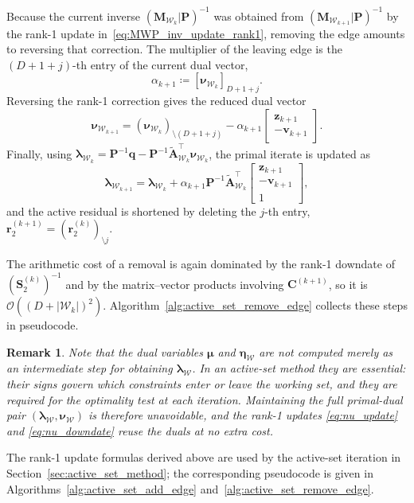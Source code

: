 \documentclass[a4paper,12pt,openany]{book}
\newcommand{\A}{\mathbf{A}}
\newcommand{\C}{\mathbf{C}}
\newcommand{\M}{\mathbf{M}}
\renewcommand{\P}{\mathbf{P}}
\newcommand{\q}{\mathbf{q}}
\renewcommand{\r}{\mathbf{r}}
\renewcommand{\v}{\mathbf{v}}
\newcommand{\z}{\mathbf{z}}
\newcommand{\lh}{\boldsymbol{\lambda}}
\newtheorem{remark}[theorem]{Remark}
\begin{document}
\begin{appendices}
Because the current inverse $(\M_{\mathcal{W}_k}|\P)^{-1}$ was obtained from $(\M_{\mathcal{W}_{k+1}}|\P)^{-1}$ by the rank-1 update in~\eqref{eq:MWP_inv_update_rank1}, removing the edge amounts to reversing that correction. The multiplier of the leaving edge is the $(D+1+j)$-th entry of the current dual vector,
\begin{equation}
	\alpha_{k+1}\coloneqq[\boldsymbol{\nu}_{\mathcal{W}_k}]_{D+1+j}.
\end{equation}
Reversing the rank-1 correction gives the reduced dual vector
\begin{equation}
	\label{eq:nu_downdate}
	\boldsymbol{\nu}_{\mathcal{W}_{k+1}}
	=
	(\boldsymbol{\nu}_{\mathcal{W}_k})_{\setminus(D+1+j)}
	-
	\alpha_{k+1}
	\begin{bmatrix}
		\z_{k+1} \\ -\v_{k+1}
	\end{bmatrix}.
\end{equation}
Finally, using $\lh_{\mathcal{W}_k}=\P^{-1}\q-\P^{-1}\tilde{\A}_{\mathcal{W}_k}^\top\boldsymbol{\nu}_{\mathcal{W}_k}$, the primal iterate is updated as
\begin{equation}
	\label{eq:lambda_downdate}
	\lh_{\mathcal{W}_{k+1}}
	=
	\lh_{\mathcal{W}_k}
	+
	\alpha_{k+1}
	\P^{-1}
	\tilde{\A}_{\mathcal{W}_k}^\top
	\begin{bmatrix}
		\z_{k+1} \\ -\v_{k+1} \\ 1
	\end{bmatrix},
\end{equation}
and the active residual is shortened by deleting the $j$-th entry, $\r_2^{(k+1)}=(\r_2^{(k)})_{\setminus j}$.

The arithmetic cost of a removal is again dominated by the rank-1 downdate of $(\mathbf{S}_2^{(k)})^{-1}$ and by the matrix--vector products involving $\C^{(k+1)}$, so it is $\mathcal{O}((D+|\mathcal{W}_k|)^2)$. Algorithm~\ref{alg:active_set_remove_edge} collects these steps in pseudocode.

\begin{remark}
	Note that the dual variables $\boldsymbol{\mu}$ and $\boldsymbol{\eta}_\mathcal{W}$ are not computed merely as an intermediate step for obtaining $\lh_\mathcal{W}$. In an active-set method they are essential: their signs govern which constraints enter or leave the working set, and they are required for the optimality test at each iteration. Maintaining the full primal-dual pair $(\lh_\mathcal{W},\boldsymbol{\nu}_\mathcal{W})$ is therefore unavoidable, and the rank-1 updates \eqref{eq:nu_update} and \eqref{eq:nu_downdate} reuse the duals at no extra cost.
\end{remark}

The rank-1 update formulas derived above are used by the active-set iteration in Section~\ref{sec:active_set_method}; the corresponding pseudocode is given in Algorithms~\ref{alg:active_set_add_edge} and~\ref{alg:active_set_remove_edge}.

\end{appendices}
\end{document}
